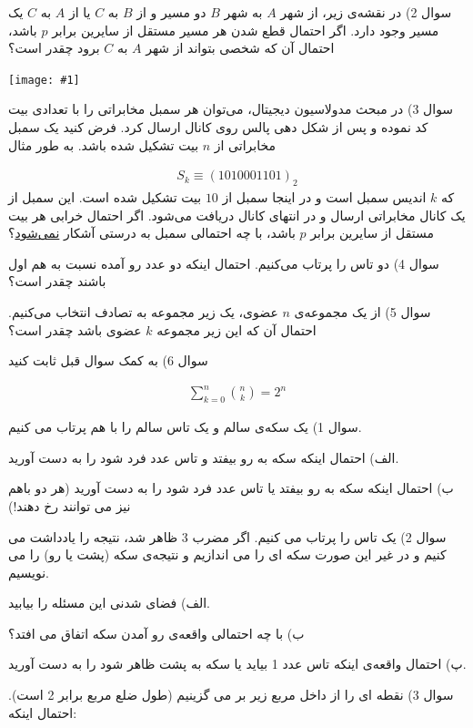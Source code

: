 \documentclass[10pt,letterpaper]{article}
\newcommand{\pic}[2]{
\begin{center}
\texttt{[image: \#1]}
\end{center}
}
\newcommand{\eqn}[1]{
\[\begin{split}
#1
\end{split}\]
}
\begin{document}
سوال 2) در نقشه‌ی زیر، از شهر $A$ به شهر $B$ دو مسیر و از $B$ به $C$ یا از $A$ به $C$ یک مسیر وجود دارد. اگر احتمال قطع شدن هر مسیر مستقل از سایرین برابر $p$ باشد، احتمال آن که شخصی بتواند از شهر $A$ به $C$ برود چقدر است؟
\pic{Q2.pdf}{100mm}

سوال 3) در مبحث مدولاسیون دیجیتال، می‌توان هر سمبل مخابراتی را با تعدادی بیت کد نموده و پس از شکل دهی پالس روی کانال ارسال کرد. فرض کنید یک سمبل مخابراتی از $n$ بیت تشکیل شده باشد. به طور مثال
\eqn{
S_k\equiv (1010001101)_2
}{}
که $k$ اندیس سمبل است و در اینجا سمبل از $10$ بیت تشکیل شده است. این سمبل از یک کانال مخابراتی ارسال و در انتهای کانال دریافت می‌شود. اگر احتمال خرابی هر بیت مستقل از سایرین برابر $p$ باشد، با چه احتمالی سمبل به درستی آشکار \underline{نمی‌شود}؟

سوال 4) دو تاس را پرتاب می‌کنیم. احتمال اینکه دو عدد رو آمده نسبت به هم اول باشند چقدر است؟

سوال 5) از یک مجموعه‌ی $n$ عضوی، یک زیر مجموعه‌ به تصادف انتخاب می‌کنیم. احتمال آن که این زیر مجموعه $k$ عضوی باشد چقدر است؟

سوال 6) به کمک سوال قبل ثابت کنید
\eqn{
\sum_{k=0}^n\binom{n}{k}=2^n
}{}

سوال 1) یک سکه‌ی سالم و یک تاس سالم را با هم پرتاب می کنیم.

الف) احتمال اینکه سکه به رو بیفتد و تاس عدد فرد شود را به دست آورید.

ب) احتمال اینکه سکه به رو بیفتد یا تاس عدد فرد شود را به دست آورید (هر دو باهم نیز می توانند رخ دهند!)

سوال 2) یک تاس را پرتاب می کنیم. اگر مضرب 3 ظاهر شد، نتیجه را یادداشت می کنیم و در غیر این صورت سکه ای را می اندازیم و نتیجه‌ی سکه (پشت یا رو) را می نویسیم.

الف) فضای شدنی این مسئله را بیابید.

ب) با چه احتمالی واقعه‌ی رو آمدن سکه اتفاق می افتد؟

پ) احتمال واقعه‌ی اینکه تاس عدد 1 بیاید یا سکه به پشت ظاهر شود را به دست آورید.

سوال 3) نقطه ای را از داخل مربع زیر بر می گزینیم (طول ضلع مربع برابر 2 است). احتمال اینکه:
\end{document}
